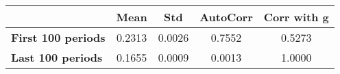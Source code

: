 \begin{tiny}\begin{tabular}{|l|c|c|c|c|}
\hline
&\textbf{Mean}&\textbf{Std}&\textbf{AutoCorr}&\textbf{Corr with g}\\\hline
\textbf{First 100 periods}&0.2313&0.0026&0.7552&0.5273\\\hline
\textbf{Last 100 periods}&0.1655&0.0009&0.0013&1.0000\\\hline
\end{tabular}
\end{tiny}